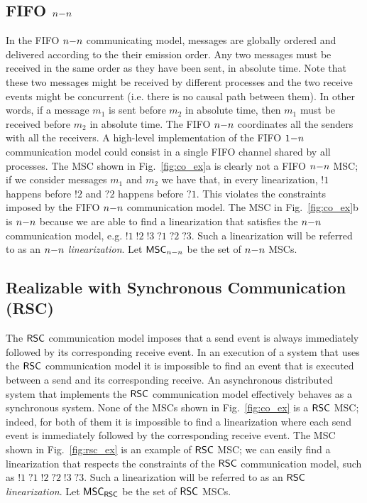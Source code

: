 \subsection{FIFO $n\mathsf{-}n$}
In the FIFO $n\mathsf{-}n$ communicating model, messages are globally ordered and delivered according to the their emission order. Any two messages must be received in the same order as they have been sent, in absolute time. Note that these two messages might be received by different processes and the two receive events might be concurrent (i.e. there is no causal path between them). In other words, if a message $m_1$ is sent before $m_2$ in absolute time, then $m_1$ must be received before $m_2$ in absolute time. The FIFO $n\mathsf{-}n$ coordinates all the senders with all the receivers. A high-level implementation of the FIFO $1\mathsf{-}n$ communication model could consist in a single FIFO channel shared by all processes. The MSC shown in Fig.~\ref{fig:co_ex}a is clearly not a FIFO $n\mathsf{-}n$ MSC; if we consider messages $m_1$ and $m_2$ we have that, in every linearization, $!1$ happens before $!2$ and $?2$ happens before $?1$. This violates the constraints imposed by the FIFO $n\mathsf{-}n$ communication model. The MSC in Fig.~\ref{fig:co_ex}b is $n\mathsf{-}n$ because we are able to find a linearization that satisfies the $n\mathsf{-}n$ communication model, e.g. $!1\;!2\;!3\;?1\;?2\;?3$. Such a linearization will be referred to as an \emph{$n\mathsf{-}n$ linearization}. Let $\mathsf{MSC}_{n\mathsf{-}n}$ be the set of $n\mathsf{-}n$ MSCs.

\subsection{Realizable with Synchronous Communication (RSC)}
The $\mathsf{RSC}$ communication model imposes that a send event is always immediately followed by its corresponding receive event. In an execution of a system that uses the $\mathsf{RSC}$ communication model it is impossible to find an event that is executed between a send and its corresponding receive. An asynchronous distributed system that implements the $\mathsf{RSC}$ communication model effectively behaves as a synchronous system. None of the MSCs shown in Fig.~\ref{fig:co_ex} is a $\mathsf{RSC}$ MSC; indeed, for both of them it is impossible to find a linearization where each send event is immediately followed by the corresponding receive event. The MSC shown in Fig.~\ref{fig:rsc_ex} is an example of $\mathsf{RSC}$ MSC; we can easily find a linearization that respects the constraints of the $\mathsf{RSC}$ communication model, such as $!1\;?1\;!2\;?2\;!3\;?3$. Such a linearization will be referred to as an \emph{$\mathsf{RSC}$ linearization}. Let $\mathsf{MSC}_{\mathsf{RSC}}$ be the set of $\mathsf{RSC}$ MSCs.

